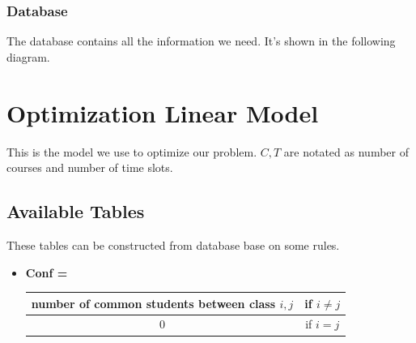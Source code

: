 \documentclass{report}
\begin{document}
\subsection{Database}
The database contains all the information we need. It's shown in the following diagram.


\chapter{Optimization Linear Model}
This is the model we use to optimize our problem. $C, T$ are notated as number of courses and number of time slots.
\section{Available Tables}
These tables can be constructed from database base on some rules.
\begin{itemize}
\item
{\textbf{Conf \big[ C \big]\big[ C \big]  \space =} \begin{tabular}{| c | c |} \hline
number of common students between class $i, j$ & if $i \neq j$ \\ \hline
0 & if $i = j$ \\ \hline
\end{tabular}}
\end{itemize}
\end{document}
